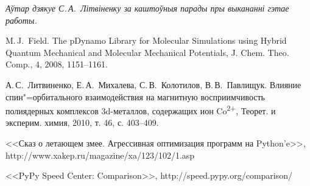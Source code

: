 \documentclass[a4paper,12pt]{article}
\newcommand{\aknowl}{\textit} %
\begin{document}
\aknowl{Аўтар дзякуе С.\,А.~Літвіненку за каштоўныя парады пры выкананні гэтае работы.}


\begin{thebibliography}{9}

 M.\,J.~Field. The pDynamo Library for Molecular Simulations using Hybrid Quantum Mechanical and Molecular Mechanical Potentials, J. Chem. Theo. Comp.,  4, 2008, 1151--1161.

 А.\,С.~Литвиненко, Е.\,А.~Михалева, С.\,В.~Колотилов, В.\,В.~Павлищук. Влияние спин"=орбитального взаимодействия на магнитную восприимчивость полиядерных комплексов 3d-металлов, содержащих ион Co\textsuperscript{2+}, Теорет. и эксперим. химия, 2010, т. 46, с. 403--409.

 <<Сказ о летающем змее. Агрессивная оптимизация программ на Python'e>>,  http://www.xakep.ru/magazine/xa/123/102/1.asp

 <<PyPy Speed Center: Comparison>>, http://speed.pypy.org/comparison/
\end{thebibliography}
\end{document}
